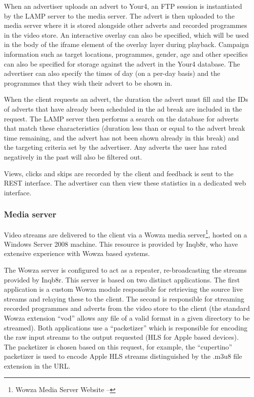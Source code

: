 When an advertiser uploads an advert to Your4, an FTP session is instantiated by the LAMP server to the media server. The advert is then uploaded to the media server where it is stored alongside other adverts and recorded programmes in the video store. An interactive overlay can also be specified, which will be used in the body of the iframe element of the overlay layer during playback. Campaign information such as target locations, programmes, gender, age and other specifics can also be specified for storage against the advert in the Your4 database. The advertiser can also specify the times of day (on a per-day basis) and the programmes that they wish their advert to be shown in.

When the client requests an advert, the duration the advert must fill and the IDs of adverts that have already been scheduled in the ad break are included in the request. The LAMP server then performs a search on the database for adverts that match these characteristics (duration less than or equal to the advert break time remaining, and the advert has not been shown already in this break) and the targeting criteria set by the advertiser. Any adverts the user has rated negatively in the past will also be filtered out.

Views, clicks and skips are recorded by the client and feedback is sent to the REST interface. The advertiser can then view these statistics in a dedicated web interface.

\subsubsection{Media server}

Video streams are delivered to the client via a Wowza media server\footnote{Wowza Media Server Website -- }, hosted on a Windows Server 2008 machine. This resource is provided by Inqb8r, who have extensive experience with Wowza based systems.

The Wowza server is configured to act as a repeater, re-broadcasting the streams provided by Inqb8r. This server is based on two distinct applications. The first application is a custom Wowza module responsible for retrieving the source live streams and relaying these to the client. The second is responsible for streaming recorded programmes and adverts from the video store to the client (the standard Wowza extension ``vod'' allows any file of a valid format in a given directory to be streamed). Both applications use a ``packetizer'' which is responsible for encoding the raw input streams to the output requested (HLS for Apple based devices). The packetizer is chosen based on this request, for example, the ``cupertino'' packetizer is used to encode Apple HLS streams distinguished by the .m3u8 file extension in the URL.

